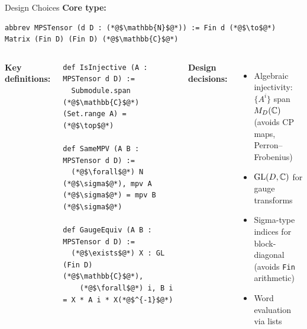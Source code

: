 \documentclass[aspectratio=169,10pt]{beamer}
\begin{document}
\begin{frame}[fragile]{Design Choices}
\textbf{Core type:}
\begin{lstlisting}
abbrev MPSTensor (d D : (*@$\mathbb{N}$@*)) := Fin d (*@$\to$@*) Matrix (Fin D) (Fin D) (*@$\mathbb{C}$@*)
\end{lstlisting}

\vspace{0.2em}
\begin{columns}[T]
\textbf{Key definitions:}
\begin{lstlisting}
def IsInjective (A : MPSTensor d D) :=
  Submodule.span (*@$\mathbb{C}$@*) (Set.range A) = (*@$\top$@*)

def SameMPV (A B : MPSTensor d D) :=
  (*@$\forall$@*) N (*@$\sigma$@*), mpv A (*@$\sigma$@*) = mpv B (*@$\sigma$@*)

def GaugeEquiv (A B : MPSTensor d D) :=
  (*@$\exists$@*) X : GL (Fin D) (*@$\mathbb{C}$@*),
    (*@$\forall$@*) i, B i = X * A i * X(*@$^{-1}$@*)
\end{lstlisting}

\textbf{Design decisions:}
\begin{itemize}
  \item Algebraic injectivity: $\{A^i\}$ span $M_D(\mathbb{C})$\\
    {\small (avoids CP maps, Perron--Frobenius)}
  \item $\mathrm{GL}(D,\mathbb{C})$ for gauge transforms
  \item Sigma-type indices for block-diagonal\\
    {\small (avoids \texttt{Fin} arithmetic)}
  \item Word evaluation via lists
\end{itemize}
\end{columns}
\end{frame}
\end{document}
